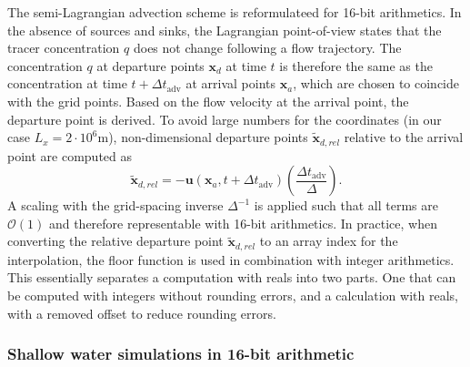 \documentclass[draft]{agujournal2019}
\newcommand{\op}{\operatorname}
\begin{document}
The semi-Lagrangian advection scheme is reformulateed for 16-bit arithmetics.
In the absence of sources and sinks, the Lagrangian point-of-view states that
the tracer concentration $q$ does not change following a flow trajectory.
The concentration $q$ at departure points $\mathbf{x}_d$ at time $t$ is therefore
the same as the concentration at time $t+\Delta t_{\op{adv}}$ at arrival points
$\mathbf{x}_a$, which are chosen to coincide with the grid points.
Based on the flow velocity at the arrival point, the departure point is derived.
To avoid large numbers for the coordinates (in our case $L_x = 2 \cdot 10^6$m),
non-dimensional departure points $\mathbf{\tilde{x}}_{d,rel}$ relative to the
arrival point are computed as
\begin{equation}
\mathbf{\tilde{x}}_{d,rel} = - \mathbf{u}(\mathbf{x}_a,t+\Delta t_{\op{adv}})
\left( \frac{\Delta t_{\op{adv}}}{\Delta} \right).
\label{eq:relcoord}
\end{equation}
A scaling with the grid-spacing inverse $\Delta^{-1}$ is applied such that all
terms are $\mathcal{O}(1)$ and therefore representable with 16-bit arithmetics.
In practice, when converting the relative departure point $\mathbf{\tilde{x}}_{d,rel}$
to an array index for the interpolation, the floor function is used in combination
with integer arithmetics. This essentially separates a computation with reals
into two parts. One that can be computed with integers without rounding errors,
and a calculation with reals, with a removed offset to reduce rounding errors.

\subsubsection{Shallow water simulations in 16-bit arithmetic}
\end{document}
